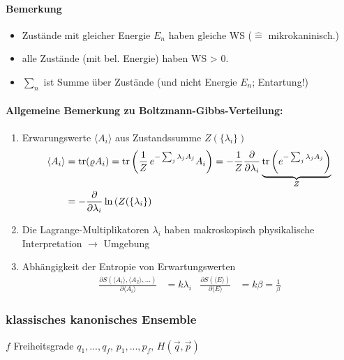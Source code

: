 \paragraph{Bemerkung}
\begin{itemize}
    \item Zustände mit gleicher Energie $E_n$ haben gleiche WS ($\widehat{=}$ mikrokaninisch.)
    \item alle Zustände (mit bel. Energie) haben WS > 0.
    \item $\sum_n$ ist Summe über Zustände (und nicht Energie $E_n$; Entartung!)
\end{itemize}

\paragraph{Allgemeine Bemerkung zu Boltzmann-Gibbs-Verteilung:}
\begin{enumerate}
    \item Erwarungswerte $\langle A_i\rangle$ aus Zustandssumme $Z\left( \{\lambda_i \}\right)$
    \begin{align}
        \langle A_i \rangle &= \trace (\varrho A_i ) = \trace \left( \frac{1}{Z} \, e^{-\sum_j \lambda_j A_j } A_i \right) = -\frac{1}{Z} \frac{\partial}{\partial \lambda_i} \underbrace{\trace\left( e^{-\sum_j \lambda_j A_j}\right)}_{Z} \\
        &= - \frac{\partial}{\partial \lambda_i} \ln \left( Z(\{\lambda_i\}\right)
    \end{align}
    \item Die Lagrange-Multiplikatoren $\lambda_i$ haben makroskopisch physikalische Interpretation $\rightarrow$ Umgebung
    \item Abhängigkeit der Entropie von Erwartungswerten
    \begin{align}
        \frac{\partial S \left( \langle A_i \rangle, \langle A_2 \rangle ,\dots \right)}{\partial \langle A_i \rangle} &= k \lambda_i & \frac{\partial S \left( \langle E \rangle\right)}{\partial \langle E \rangle}&= k \beta = \frac{1}{\beta}
    \end{align}
\end{enumerate}

\subsubsection{klassisches kanonisches Ensemble}
$f$ Freiheitsgrade $q_1, ... , q_f, \, p_1, ... , p_f, \, H(\Vec{q},\Vec{p})$

